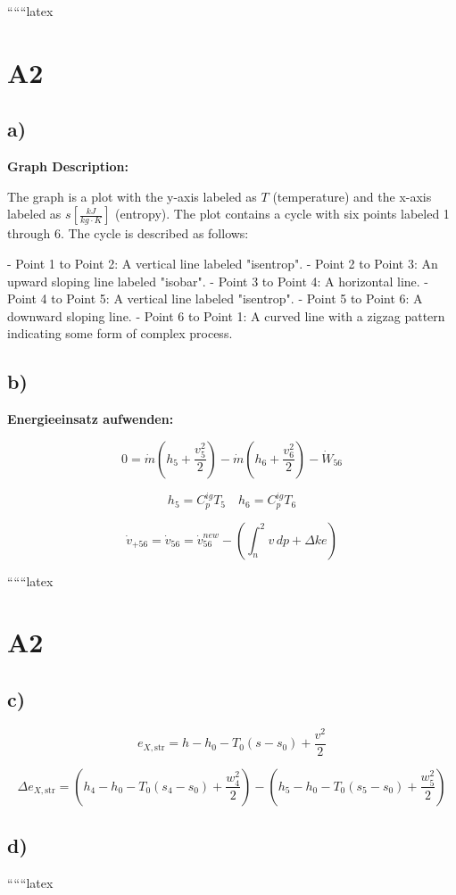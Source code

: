 
``````latex


\section*{A2}

\subsection*{a)}

\begin{center}
\textbf{Graph Description:}
\end{center}

The graph is a plot with the y-axis labeled as \( T \) (temperature) and the x-axis labeled as \( s \left[ \frac{kJ}{kg \cdot K} \right] \) (entropy). The plot contains a cycle with six points labeled 1 through 6. The cycle is described as follows:

- Point 1 to Point 2: A vertical line labeled "isentrop".
- Point 2 to Point 3: An upward sloping line labeled "isobar".
- Point 3 to Point 4: A horizontal line.
- Point 4 to Point 5: A vertical line labeled "isentrop".
- Point 5 to Point 6: A downward sloping line.
- Point 6 to Point 1: A curved line with a zigzag pattern indicating some form of complex process.

\subsection*{b)}

\textbf{Energieeinsatz aufwenden:}

\[
0 = \dot{m} \left( h_5 + \frac{v_5^2}{2} \right) - \dot{m} \left( h_6 + \frac{v_6^2}{2} \right) - \dot{W}_{56}
\]

\[
h_5 = C_p^{ig} T_5 \quad h_6 = C_p^{ig} T_6
\]

\[
\dot{v}_{+56} = \dot{v}_{56} = \dot{v}_{56}^{new} - \left( \int_{n}^{2} v \, dp + \Delta ke \right)
\]

``````latex


\section*{A2}

\subsection*{c)}

\[
e_{X, \text{str}} = h - h_0 - T_0 (s - s_0) + \frac{v^2}{2}
\]

\[
\Delta e_{X, \text{str}} = \left( h_4 - h_0 - T_0 (s_4 - s_0) + \frac{w_4^2}{2} \right) - \left( h_5 - h_0 - T_0 (s_5 - s_0) + \frac{w_5^2}{2} \right)
\]

\subsection*{d)}

``````latex


